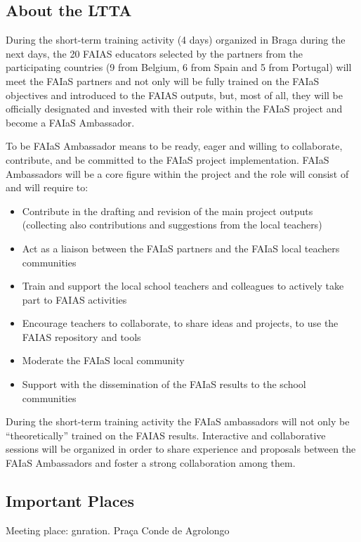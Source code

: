 \documentclass[11pt]{article}
\begin{document}
\subsection*{About the LTTA}

During the short-term training activity (4 days) organized in Braga during the next days, the 20 FAIAS educators selected by the partners from the participating countries (9 from Belgium, 6 from Spain and 5 from Portugal) will meet the FAIaS partners and not only will be fully trained on the FAIaS objectives and introduced to the FAIAS outputs, but, most of all, they will be officially designated and invested with their role within the FAIaS project and become a FAIaS Ambassador.

To be FAIaS Ambassador means to be ready, eager and willing to collaborate, contribute, and be committed to the FAIaS project implementation. FAIaS Ambassadors will be a core figure within the project and the role will consist of and will require to:
\begin{itemize}
    \item Contribute in the drafting and revision of the main project outputs (collecting also contributions and suggestions from the local teachers)
    \item Act as a liaison between the FAIaS partners and the FAIaS local teachers communities 
    \item Train and support the local school teachers and colleagues to actively take part to FAIAS activities
    \item Encourage teachers to collaborate, to share ideas and projects, to use the FAIAS repository and tools 
    \item Moderate the FAIaS local community 
    \item Support with the dissemination of the FAIaS results to the school communities
\end{itemize}

During the short-term training activity the FAIaS ambassadors will not only be “theoretically” trained on the FAIAS results. Interactive and collaborative sessions will be organized in order to share experience and proposals between the FAIaS Ambassadors and foster a strong collaboration among them.

\subsection*{Important Places}

Meeting place: 
gnration.
Praça Conde de Agrolongo 
\end{document}
